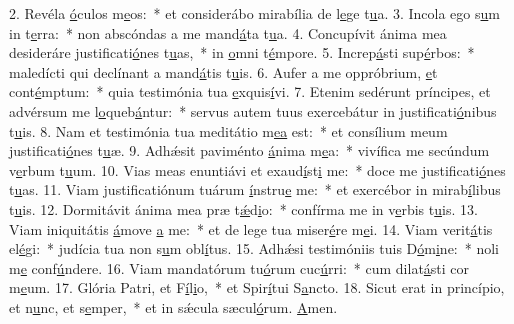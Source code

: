 2. Revéla \uline{ó}culos m\uline{e}os:~* et considerábo mirabília de l\uline{e}ge t\uline{u}a.
3. Incola ego s\uline{u}m in t\uline{e}rra:~* non abscóndas a me mand\uline{á}ta t\uline{u}a.
4. Concupívit ánima mea desideráre justificati\uline{ó}nes t\uline{u}as,~* in \uline{o}mni t\uline{é}mpore.
5. Increp\uline{á}sti sup\uline{é}rbos:~* maledícti qui declínant a mand\uline{á}tis t\uline{u}is.
6. Aufer a me oppróbrium, \uline{e}t cont\uline{é}mptum:~* quia testimónia tua \uline{e}xquis\uline{í}vi.
7. Etenim sedérunt príncipes, et advérsum me l\uline{o}queb\uline{á}ntur:~* servus autem tuus exercebátur in justificati\uline{ó}nibus t\uline{u}is.
8. Nam et testimónia tua meditátio m\uline{e}\uline{a} est:~* et consílium meum justificati\uline{ó}nes t\uline{u}æ.
9. Adhǽsit paviménto \uline{á}nima m\uline{e}a:~* vivífica me secúndum v\uline{e}rbum t\uline{u}um.
10. Vias meas enuntiávi et exaud\uline{í}st\uline{i} me:~* doce me justificati\uline{ó}nes t\uline{u}as.
11. Viam justificatiónum tuárum \uline{í}nstru\uline{e} me:~* et exercébor in mirab\uline{í}libus t\uline{u}is.
12. Dormitávit ánima mea præ t\uline{ǽ}d\uline{i}o:~* confírma me in v\uline{e}rbis t\uline{u}is.
13. Viam iniquitátis \uline{á}move \uline{a} me:~* et de lege tua miser\uline{é}re m\uline{e}i.
14. Viam verit\uline{á}tis el\uline{é}gi:~* judícia tua non s\uline{u}m obl\uline{í}tus.
15. Adhǽsi testimóniis tuis D\uline{ó}m\uline{i}ne:~* noli m\uline{e} conf\uline{ú}ndere.
16. Viam mandatórum tu\uline{ó}rum cuc\uline{ú}rri:~* cum dilat\uline{á}sti cor m\uline{e}um.
17. Glória Patri, et F\uline{í}l\uline{i}o,~* et Spir\uline{í}tui S\uline{a}ncto.
18. Sicut erat in princípio, et n\uline{u}nc, et s\uline{e}mper,~* et in sǽcula sæcul\uline{ó}rum. \uline{A}men.
